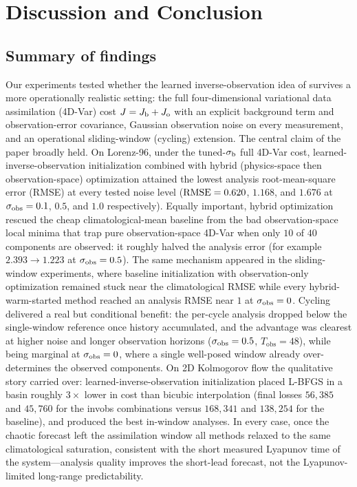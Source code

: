 \section{Discussion and Conclusion}

\subsection{Summary of findings}

Our experiments tested whether the learned inverse-observation idea of
\citet{frerix2021invobs} survives a more operationally realistic setting: the
full four-dimensional variational data assimilation (4D-Var) cost
$J = J_{\mathrm{b}} + J_{\mathrm{o}}$ with an explicit background term and observation-error
covariance, Gaussian observation noise on every measurement, and an
operational sliding-window (cycling) extension. The central claim of the
paper broadly held. On Lorenz-96, under the tuned-$\sigma_{\mathrm{b}}$ full 4D-Var cost,
learned-inverse-observation initialization combined with hybrid
(physics-space then observation-space) optimization attained the lowest
analysis root-mean-square error (RMSE) at every tested noise level
($\mathrm{RMSE} = 0.620$, $1.168$, and $1.676$ at $\sigma_{\mathrm{obs}} = 0.1$, $0.5$, and $1.0$
respectively). Equally important, hybrid optimization rescued the cheap
climatological-mean baseline from the bad observation-space local minima that
trap pure observation-space 4D-Var when only $10$ of $40$ components are
observed: it roughly halved the analysis error (for example $2.393 \to 1.223$
at $\sigma_{\mathrm{obs}} = 0.5$). The same mechanism appeared in the sliding-window
experiments, where baseline initialization with observation-only optimization
remained stuck near the climatological RMSE while every hybrid-warm-started
method reached an analysis RMSE near $1$ at $\sigma_{\mathrm{obs}} = 0$. Cycling delivered a
real but conditional benefit: the per-cycle analysis dropped below the
single-window reference once history accumulated, and the advantage was
clearest at higher noise and longer observation horizons
($\sigma_{\mathrm{obs}} = 0.5$, $T_{\mathrm{obs}} = 48$), while being marginal at
$\sigma_{\mathrm{obs}} = 0$, where a single well-posed window already over-determines the
observed components. On 2D Kolmogorov flow the qualitative story carried over:
learned-inverse-observation initialization placed L-BFGS in a basin roughly
$3\times$ lower in cost than bicubic interpolation (final losses $56{,}385$
and $45{,}760$ for the invobs combinations versus $168{,}341$ and $138{,}254$
for the baseline), and produced the best in-window analyses. In every case,
once the chaotic forecast left the assimilation window all methods relaxed to
the same climatological saturation, consistent with the short measured
Lyapunov time of the system---analysis quality improves the short-lead
forecast, not the Lyapunov-limited long-range predictability.

